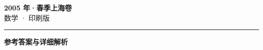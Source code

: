 \documentclass[zihao=5, a4paper]{ctexart}
\begin{document}
\begin{center}
  {\Large\bfseries 2005 年·春季上海卷}\\[4pt]
  {\large 数学 · 印刷版}
\end{center}
\medskip
{}

\par\bigskip\hrule\bigskip
{}
\begin{center}{\large\bfseries 参考答案与详细解析}\end{center}
\smallskip

\end{document}
